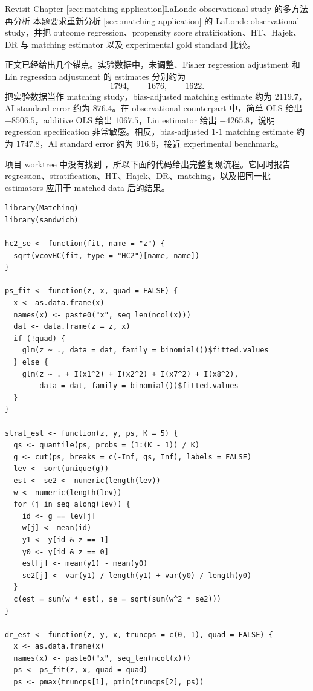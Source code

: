 \begin{exercisesolution}{Revisit Chapter \cref{sec::matching-application}}{LaLonde observational study 的多方法再分析}
本题要求重新分析 \cref{sec::matching-application} 的 LaLonde observational study，并把 outcome regression、propensity score stratification、HT、Hajek、DR 与 matching estimator 以及 experimental gold standard 比较。

正文已经给出几个锚点。实验数据中，未调整、Fisher regression adjustment 和 Lin regression adjustment 的 estimates 分别约为
\[
1794,\qquad 1676,\qquad 1622.
\]
把实验数据当作 matching study，bias-adjusted matching estimate 约为 $2119.7$，AI standard error 约为 $876.4$。在 observational counterpart  中，简单 OLS 给出 $-8506.5$，additive OLS 给出 $1067.5$，Lin estimator 给出 $-4265.8$，说明 regression specification 非常敏感。相反，bias-adjusted $1$-$1$ matching estimate 约为 $1747.8$，AI standard error 约为 $916.6$，接近 experimental benchmark。

项目 worktree 中没有找到 ，所以下面的代码给出完整复现流程。它同时报告 regression、stratification、HT、Hajek、DR、matching，以及把同一批 estimators 应用于 matched data 后的结果。

\begin{lstlisting}
library(Matching)
library(sandwich)

hc2_se <- function(fit, name = "z") {
  sqrt(vcovHC(fit, type = "HC2")[name, name])
}

ps_fit <- function(z, x, quad = FALSE) {
  x <- as.data.frame(x)
  names(x) <- paste0("x", seq_len(ncol(x)))
  dat <- data.frame(z = z, x)
  if (!quad) {
    glm(z ~ ., data = dat, family = binomial())$fitted.values
  } else {
    glm(z ~ . + I(x1^2) + I(x2^2) + I(x7^2) + I(x8^2),
        data = dat, family = binomial())$fitted.values
  }
}

strat_est <- function(z, y, ps, K = 5) {
  qs <- quantile(ps, probs = (1:(K - 1)) / K)
  g <- cut(ps, breaks = c(-Inf, qs, Inf), labels = FALSE)
  lev <- sort(unique(g))
  est <- se2 <- numeric(length(lev))
  w <- numeric(length(lev))
  for (j in seq_along(lev)) {
    id <- g == lev[j]
    w[j] <- mean(id)
    y1 <- y[id & z == 1]
    y0 <- y[id & z == 0]
    est[j] <- mean(y1) - mean(y0)
    se2[j] <- var(y1) / length(y1) + var(y0) / length(y0)
  }
  c(est = sum(w * est), se = sqrt(sum(w^2 * se2)))
}

dr_est <- function(z, y, x, truncps = c(0, 1), quad = FALSE) {
  x <- as.data.frame(x)
  names(x) <- paste0("x", seq_len(ncol(x)))
  ps <- ps_fit(z, x, quad = quad)
  ps <- pmax(truncps[1], pmin(truncps[2], ps))


\end{lstlisting}
\end{exercisesolution}
